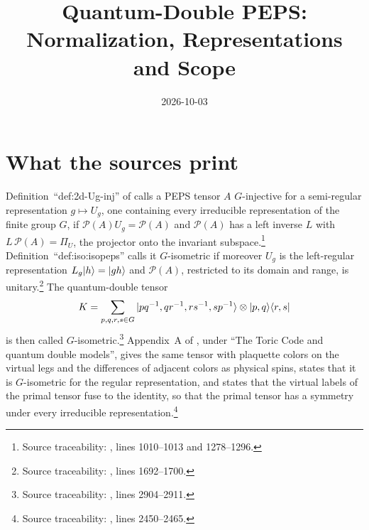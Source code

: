 \documentclass{article}
\title{Quantum-Double PEPS: Normalization, Representations and Scope}
\author{}
\date{2026-10-03}
\begin{document}
\maketitle
{}

\section{What the sources print}
Definition~``def:2d-Ug-inj'' of \cite{Schuch2010PEPS} calls a PEPS tensor
$A$ $G$-injective for a semi-regular representation $g\mapsto U_g$, one
containing every irreducible representation of the finite group $G$, if
$\mathcal P(A)U_g=\mathcal P(A)$ and $\mathcal P(A)$ has a left inverse
$L$ with $L\,\mathcal P(A)=\Pi_U$, the projector onto the invariant
subspace.\footnote{Source traceability:
    , lines 1010--1013 and
    1278--1296.}
Definition~``def:iso:isopeps'' calls it $G$-isometric if moreover $U_g$ is
the left-regular representation $L_g|h\rangle=|gh\rangle$ and $\mathcal P(A)$,
restricted to its domain and range, is unitary.\footnote{Source
    traceability: , lines
    1692--1700.}
The quantum-double tensor
\begin{align}
    K=\sum_{p,q,r,s\in G}|pq^{-1},qr^{-1},rs^{-1},sp^{-1}\rangle\otimes
    |p,q\rangle\langle r,s|
    \label{eq:rmp_peps_qd_tensor}
\end{align}
is then called $G$-isometric.\footnote{Source traceability:
    , lines 2904--2911.}
Appendix~A of \cite{Cirac2021Matrix}, under ``The Toric Code and quantum
double models'', gives the same tensor with plaquette colors on the
virtual legs and the differences of adjacent colors as physical spins,
states that it is $G$-isometric for the regular representation, and
states that the virtual labels of the primal tensor fuse to the identity,
so that the primal tensor has a symmetry under every irreducible
representation.\footnote{Source traceability:
    , lines 2450--2465.}
\end{document}
